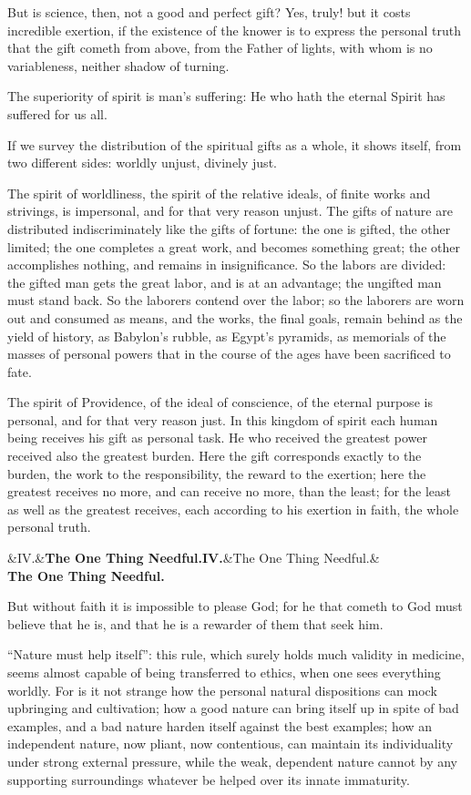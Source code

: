 \documentclass[12pt,a4paper,openany]{book}
\newcommand{\opage}[1]{\marginnote{\footnotesize\textit{[#1]}}}
\newcommand{\stykke}[2]{\begin{center}\ifx&#1&\textbf{#2}\else\textbf{#1}\ifx&#2&\else\\[0.2em]\textbf{#2}\fi\fi\end{center}}
\begin{document}
But is science, then, not a good and perfect
gift? Yes, truly! but it costs
incredible exertion, if the existence of the knower
is to express the personal truth that the
gift cometh from above, from the Father of lights,
with whom is no variableness, neither shadow
of turning.

The superiority of spirit is man's suffering:
He who hath the eternal Spirit has suffered for
us all.

\setcounter{footnote}{0}%
\opage{76}If we survey the distribution of the spiritual
gifts as a whole, it shows itself, from two different
sides: worldly unjust, divinely
just.

The spirit of worldliness, the spirit of the relative ideals,
of finite works and strivings,
is impersonal, and for that very reason unjust. The gifts of nature
are distributed indiscriminately like the gifts of
fortune: the one is gifted, the other limited;
the one completes a great work, and
becomes something great; the other accomplishes nothing,
and remains in insignificance. So the labors are divided:
the gifted man gets the great labor,
and is at an advantage; the ungifted man must stand back.
So the laborers contend over the labor;
so the laborers are worn out and consumed as
means, and the works, the final goals, remain
behind as the yield of history, as Babylon's
rubble, as Egypt's pyramids, as memorials
of the masses of personal powers
that in the course of the ages have been sacrificed to fate.

The spirit of Providence, of the ideal of conscience, of the eternal
purpose is personal, and for that very reason
just. In this kingdom of spirit each
human being receives his gift as personal task.
\setcounter{footnote}{0}%
\opage{77}He who received the greatest power received also the
greatest burden. Here the gift corresponds exactly to
the burden, the work to the responsibility, the reward to the exertion;
here the greatest receives no more,
and can receive no more, than the least; for
the least as well as the greatest receives,
each according to his exertion in faith, the whole
personal truth.

\stykke{IV.}{The One Thing Needful.}

But without faith it is impossible to please God; for he
that cometh to God must believe that
he is, and that he is a rewarder of them that
seek him.

``Nature must help itself'': this rule,
which surely holds much validity in medicine,
seems almost capable of being transferred to ethics,
when one sees everything worldly. For is it
not strange how the personal natural dispositions
can mock upbringing and cultivation;
how a good nature can bring itself up
in spite of bad examples, and a bad nature harden
itself against the best examples; how an independent
nature, now pliant, now contentious, can
\setcounter{footnote}{0}%
\opage{78}maintain its individuality under strong external
pressure, while the weak, dependent
nature cannot by any supporting
surroundings whatever be helped over its innate
immaturity.
\end{document}
